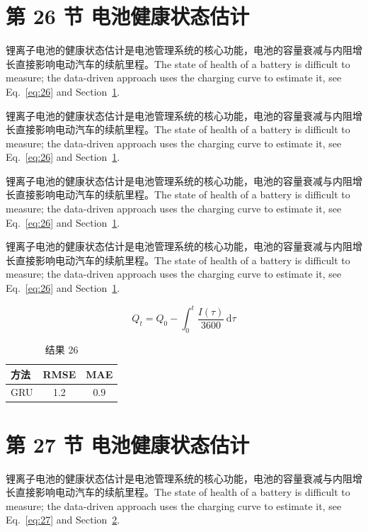 \documentclass[UTF8,fontset=mac]{ctexart}
\begin{document}
\section{第 26 节 电池健康状态估计}\label{sec:26}
锂离子电池的健康状态估计是电池管理系统的核心功能，电池的容量衰减与内阻增长直接影响电动汽车的续航里程\cite{a2020}。The state of health of a battery is difficult to measure; the data-driven approach uses the charging curve to estimate it, see Eq.~\eqref{eq:26} and Section~\ref{sec:26}.

锂离子电池的健康状态估计是电池管理系统的核心功能，电池的容量衰减与内阻增长直接影响电动汽车的续航里程\cite{a2020}。The state of health of a battery is difficult to measure; the data-driven approach uses the charging curve to estimate it, see Eq.~\eqref{eq:26} and Section~\ref{sec:26}.

锂离子电池的健康状态估计是电池管理系统的核心功能，电池的容量衰减与内阻增长直接影响电动汽车的续航里程\cite{a2020}。The state of health of a battery is difficult to measure; the data-driven approach uses the charging curve to estimate it, see Eq.~\eqref{eq:26} and Section~\ref{sec:26}.

锂离子电池的健康状态估计是电池管理系统的核心功能，电池的容量衰减与内阻增长直接影响电动汽车的续航里程\cite{a2020}。The state of health of a battery is difficult to measure; the data-driven approach uses the charging curve to estimate it, see Eq.~\eqref{eq:26} and Section~\ref{sec:26}.

\begin{equation}\label{eq:26}
  Q_t = Q_0 - \int_0^t \frac{I(\tau)}{3600}\,\mathrm{d}\tau
\end{equation}
\begin{table}[h]\centering\begin{tabular}{lcc}\toprule 方法 & RMSE & MAE\\\midrule GRU & 1.2 & 0.9\\\bottomrule\end{tabular}\caption{结果 26}\end{table}

\section{第 27 节 电池健康状态估计}\label{sec:27}
锂离子电池的健康状态估计是电池管理系统的核心功能，电池的容量衰减与内阻增长直接影响电动汽车的续航里程\cite{a2020}。The state of health of a battery is difficult to measure; the data-driven approach uses the charging curve to estimate it, see Eq.~\eqref{eq:27} and Section~\ref{sec:27}.
\end{document}
